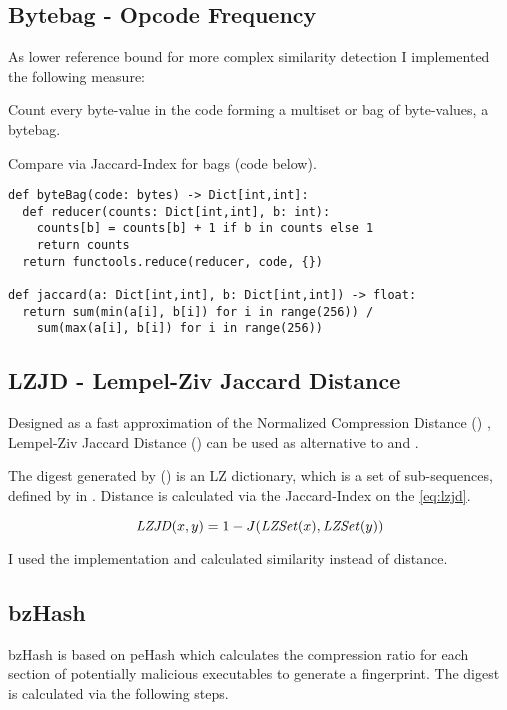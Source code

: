 \documentclass[../main.tex]{subfiles}
\begin{document}
\subsection{Bytebag - Opcode Frequency \label{sec:bytebag}}
As lower reference bound for more complex similarity detection I implemented the following measure:

\begin{ol}
  \item Count every byte-value in the code forming a multiset or bag of byte-values, a bytebag.
  \item Compare via Jaccard-Index for bags (code below).
\end{ol}

\begin{lstlisting}[style=pymd]
def byteBag(code: bytes) -> Dict[int,int]:
  def reducer(counts: Dict[int,int], b: int):
    counts[b] = counts[b] + 1 if b in counts else 1
    return counts
  return functools.reduce(reducer, code, {})

def jaccard(a: Dict[int,int], b: Dict[int,int]) -> float:
  return sum(min(a[i], b[i]) for i in range(256)) /
    sum(max(a[i], b[i]) for i in range(256))
\end{lstlisting}

\subsection{LZJD - Lempel-Ziv Jaccard Distance \label{sec:lzjd}}
Designed as a fast approximation of the Normalized Compression Distance () \cite{raff2017alternative}, Lempel-Ziv Jaccard Distance () can be used as alternative to  and  \cite{raff2018lempel}.

The digest generated by  () is an LZ dictionary, which is a set of sub-sequences, defined by  in \cite{raff2017alternative}. Distance is calculated via the Jaccard-Index  on the  \eqref{eq:lzjd}.

\begin{equation}
  \mbox{\textit{LZJD}}(x,y) = 1 - J(\mbox{\textit{LZSet}}(x), \mbox{\textit{LZSet}}(y))
  \label{eq:lzjd}
\end{equation}

I used the \cite{raff2019pylzjd} implementation and calculated similarity instead of distance.

\subsection{bzHash \label{sec:bz}}
bzHash is based on peHash\cite{wicherski2009pehash} which calculates the compression ratio for each section of potentially malicious executables to generate a fingerprint. The digest is calculated via the following steps.
\end{document}
